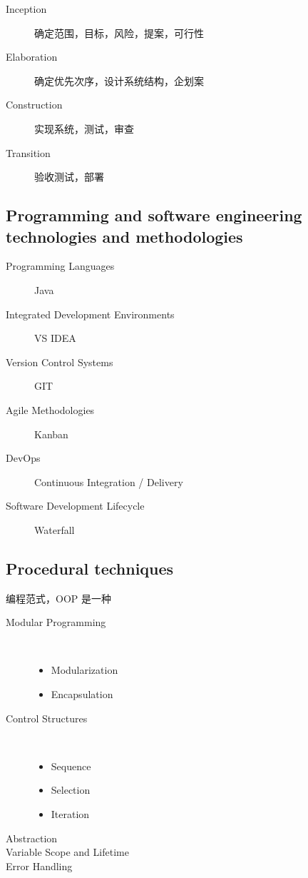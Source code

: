 \documentclass[11pt,journal,compsoc]{IEEEtran}
\begin{document}
\begin{description}
    \item[Inception] 确定范围，目标，风险，提案，可行性

    \item[Elaboration] 确定优先次序，设计系统结构，企划案

    \item[Construction] 实现系统，测试，审查

    \item[Transition] 验收测试，部署
\end{description}


\subsection{Programming and software engineering technologies and methodologies}

\begin{description}
    \item[Programming Languages] Java
    
    \item[Integrated Development Environments] VS IDEA

    \item[Version Control Systems] GIT

    \item[Agile Methodologies] Kanban

    \item[DevOps] Continuous Integration / Delivery

    \item[Software Development Lifecycle] Waterfall
\end{description}


\subsection{Procedural techniques}

编程范式，OOP 是一种

\begin{description}
    \item[Modular Programming] ~

    \begin{itemize}
        \item Modularization
        \item Encapsulation
    \end{itemize}

    \item[Control Structures] ~

    \begin{itemize}
        \item Sequence
        \item Selection
        \item Iteration
    \end{itemize}

    \item[Abstraction] 

    \item[Variable Scope and Lifetime] 

    \item[Error Handling] 
\end{description}
\end{document}
